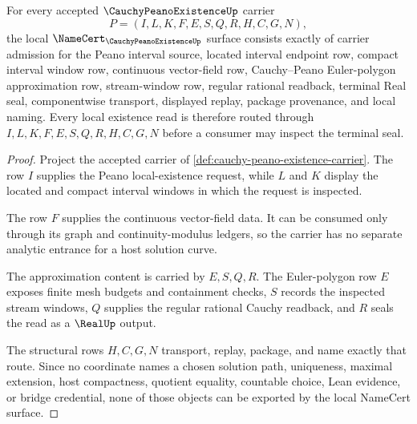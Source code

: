 \begin{theorem}
\label{thm:cauchy-peano-existence-namecert-obligations}
For every accepted $\CauchyPeanoExistenceUp$ carrier
$$
P=(I,L,K,F,E,S,Q,R,H,C,G,N),
$$
the local $\NameCert_{\CauchyPeanoExistenceUp}$ surface consists exactly of carrier admission for the Peano interval source, located interval endpoint row, compact interval window row, continuous vector-field row, Cauchy--Peano Euler-polygon approximation row, stream-window row, regular rational readback, terminal Real seal, componentwise transport, displayed replay, package provenance, and local naming. Every local existence read is therefore routed through $I,L,K,F,E,S,Q,R,H,C,G,N$ before a consumer may inspect the terminal seal.
\end{theorem}
\begin{proof}
Project the accepted carrier of \autoref{def:cauchy-peano-existence-carrier}. The row $I$ supplies the Peano local-existence request, while $L$ and $K$ display the located and compact interval windows in which the request is inspected.

The row $F$ supplies the continuous vector-field data. It can be consumed only through its graph and continuity-modulus ledgers, so the carrier has no separate analytic entrance for a host solution curve.

The approximation content is carried by $E,S,Q,R$. The Euler-polygon row $E$ exposes finite mesh budgets and containment checks, $S$ records the inspected stream windows, $Q$ supplies the regular rational Cauchy readback, and $R$ seals the read as a $\RealUp$ output.

The structural rows $H,C,G,N$ transport, replay, package, and name exactly that route. Since no coordinate names a chosen solution path, uniqueness, maximal extension, host compactness, quotient equality, countable choice, Lean evidence, or bridge credential, none of those objects can be exported by the local NameCert surface.
\end{proof}

